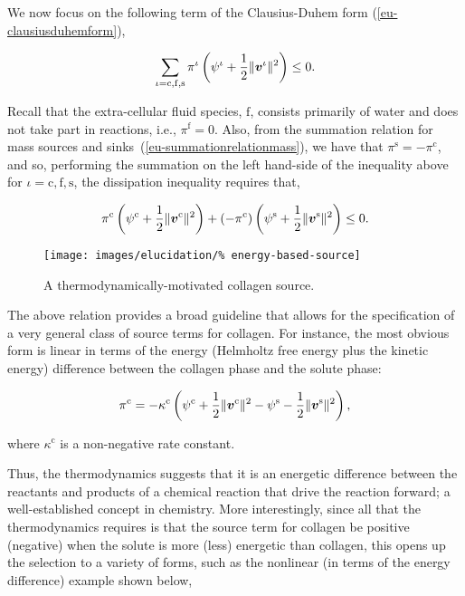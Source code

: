 We now focus on the following term of the Clausius-Duhem form
(\ref{eu-clausiusduhemform}),

\begin{equation*}
\sum\limits_{\iota=\mathrm{c},\mathrm{f},\mathrm{s}} 
 \pi^{\iota} \left(\psi^{\iota}+\frac{1}{2}
\Vert\mbox{\boldmath$ v$}^\iota\Vert^2\right) \leq 0.
\end{equation*}

Recall that the extra-cellular fluid species, $\mathrm{f}$, consists
primarily of water and does not take part in reactions, i.e.,
$\pi^\mathrm{f} = 0$. Also, from the summation relation for mass
sources and sinks~(\ref{eu-summationrelationmass}), we have that
$\pi^\mathrm{s} = - \pi^\mathrm{c}$, and so, performing the summation
on the left hand-side of the inequality above for
$\iota=\mathrm{c,f,s}$, the dissipation inequality requires that,

\begin{equation*}
 \pi^{\mathrm{c}} \left(\psi^{\mathrm{c}}+\frac{1}{2}
\Vert\mbox{\boldmath$ v$}^{\mathrm{c}}\Vert^2\right)
+ \left(-\pi^{\mathrm{c}}\right) \left(\psi^{\mathrm{s}}+\frac{1}{2}
\Vert\mbox{\boldmath$ v$}^{\mathrm{s}}\Vert^2\right) \leq 0.
\end{equation*}

\begin{figure}
  \centering
  \texttt{[image: images/elucidation/\%
    energy-based-source]}
  \caption{A thermodynamically-motivated collagen source.}
  \label{energy-based-source}
\end{figure}

\noindent The above relation provides a broad guideline that allows
for the specification of a very general class of source terms for
collagen. For instance, the most obvious form is linear in terms of
the energy (Helmholtz free energy plus the kinetic energy) difference
between the collagen phase and the solute phase:

\begin{equation}
 \pi^{\mathrm{c}} = -\kappa^{\mathrm{c}}
 \left(\psi^{\mathrm{c}}+\frac{1}{2} \Vert\mbox{\boldmath$ v$}^{\mathrm{c}}\Vert^2 -
 \psi^{\mathrm{s}}-\frac{1}{2} \Vert\mbox{\boldmath$ v$}^{\mathrm{s}}\Vert^2\right),
\label{eu-energy-source-linear}
\end{equation}

\noindent where $\kappa^{\mathrm{c}}$ is a non-negative rate
constant.

Thus, the thermodynamics suggests that it is an energetic difference
between the reactants and products of a chemical reaction that drive
the reaction forward; a well-established concept in
chemistry. More interestingly, since all that the thermodynamics
requires is that the source term for collagen be positive (negative)
when the solute is more (less) energetic than collagen, this opens up
the selection to a variety of forms, such as the nonlinear (in terms
of the energy difference) example shown below,

